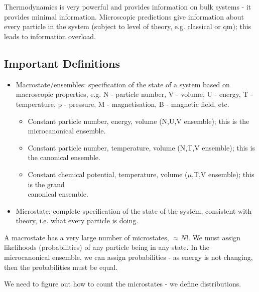 \documentclass[a4paper, 11pt, normalem]{report}
\begin{document}
\chapter{}
Thermodynamics is very powerful and provides information on bulk systems - it provides minimal information.
Microscopic predictions give information about every particle in the system (subject to level of theory, e.g. classical or qm); this leads to information overload.

\section{Important Definitions}
\begin{itemize}
    \item Macrostate/ensembles: specification of the state of a system based on macroscopic properties, e.g. N - particle number, V - volume, U - energy, T - temperature, p - pressure, M - magnetisation, B - magnetic field, etc.
        \begin{itemize}
            \item Constant particle number, energy, volume (N,U,V ensemble); this is the microcanonical ensemble.
            \item Constant particle number, temperature, volume (N,T,V ensemble); this is the canonical ensemble.
            \item Constant chemical potential, temperature, volume ($\mu$,T,V ensemble); this is the grand\\ canonical ensemble.
        \end{itemize}
    \item Microstate: complete specification of the state of the system, consistent with theory, i.e. what every particle is doing.
\end{itemize}
A macrostate has a very large number of microstates, $\approx N!$.
We must assign likelihoods (probabilities) of any particle being in any state.
In the microcanonical ensemble, we can assign probabilities - as energy is not changing, then the probabilities must be equal.

We need to figure out how to count the microstates - we define distributions.
\end{document}
